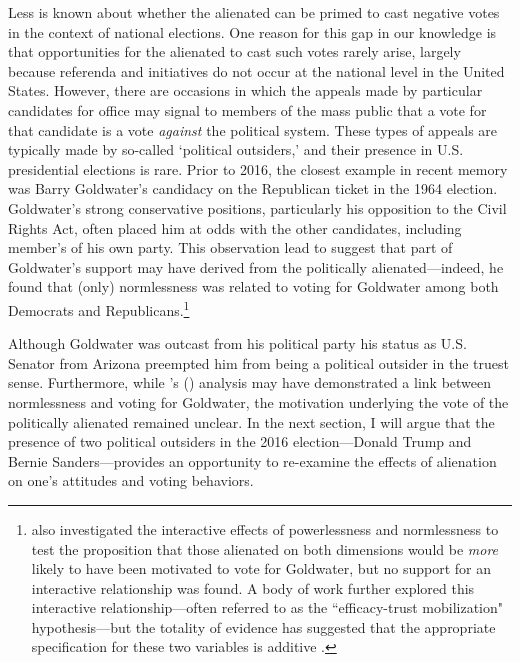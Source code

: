 \documentclass[12pt]{article}
\begin{document}
 Less is known about whether the alienated can be primed to cast negative votes in the context of national elections. One reason for this gap in our knowledge is that opportunities for the alienated to cast such votes rarely arise, largely because referenda and initiatives do not occur at the national level in the United States. However, there are occasions in which the appeals made by particular candidates for office may signal to members of the mass public that a vote for that candidate is a vote \textit{against} the political system. These types of appeals are typically made by so-called `political outsiders,' and their presence in U.S. presidential elections is rare. Prior to 2016, the closest example in recent memory was Barry Goldwater's candidacy on the Republican ticket in the 1964 election. Goldwater's strong conservative positions, particularly his opposition to the Civil Rights Act, often placed him at odds with the other candidates, including member's of his own party. This observation lead \textcite{aberbach1969alienation} to suggest that part of Goldwater's support may have derived from the politically alienated---indeed, he found that (only) normlessness was related to voting for Goldwater among both Democrats and Republicans.\footnote{\textcite{aberbach1969alienation} also investigated the interactive effects of powerlessness and normlessness to test the proposition that those alienated on both dimensions would be \textit{more} likely to have been motivated to vote for Goldwater, but no support for an interactive relationship was found. A body of work further explored this interactive relationship---often referred to as the ``efficacy-trust mobilization" hypothesis---but the totality of evidence has suggested that the appropriate specification for these two variables is additive \parencite[e.g.,][]{sigelman1983efficacy,fraser1970mistrustful}.}
 
 Although Goldwater was outcast from his political party his status as U.S. Senator from Arizona preempted him from being a political outsider in the truest sense. Furthermore, while \citeauthor{aberbach1969alienation}'s (\citeyear{aberbach1969alienation}) analysis may have demonstrated a link between normlessness and voting for Goldwater, the motivation underlying the vote of the politically alienated remained unclear. In the next section, I will argue that the presence of two political outsiders in the 2016 election---Donald Trump and Bernie Sanders---provides an opportunity to re-examine the effects of alienation on one's attitudes and voting behaviors. 
 
\end{document}
